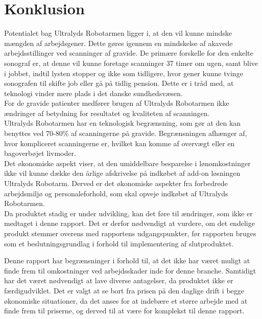 \chapter{Konklusion}
Potentialet bag Ultralyds Robotarmen ligger i, at den vil kunne mindske mængden af arbejdsgener. Dette gøres igennem en mindskelse af akavede arbejdsstillinger ved scanninger af gravide.
De primære forskelle for den enkelte sonograf er, at denne vil kunne foretage scanninger 37 timer om ugen, samt blive i jobbet, indtil lysten stopper og ikke som tidligere, hvor gener kunne tvinge sonografen til skifte job eller gå på tidlig pension. Dette er i tråd med, at teknologi vinder mere plads i det danske sundhedsvæsen.\\
For de gravide patienter medfører brugen af Ultralyds Robotarmen ikke ændringer af betydning for resultatet og kvaliteten af scanningen. \\
Ultralyds Robotarmen har en teknologisk begrænsning, som gør at den kan benyttes ved 70-80\% af scanningerne på gravide. Begrænsningen afhænger af, hvor kompliceret scanningerne er, hvilket kan komme af overvægt eller en bagoverbøjet livmoder. \\
Det økonomiske aspekt viser, at den umiddelbare besparelse i lønomkostninger ikke vil kunne dække den årlige afskrivelse på indkøbet af add-on løsningen Ultralyds Robotarm. Derved er det økonomiske aspekter fra forbedrede arbejdsmiljø og personaleforhold, som skal opveje indkøbet af Ultralyds Robotarmen.\\  
Da produktet stadig er under udvikling, kan det føre til ændringer, som ikke er medtaget i denne rapport. Det er derfor nødvendigt at vurdere, om det endelige produkt stemmer overens med rapportens udgangspunkter, før rapporten bruges som et beslutningsgrundlag i forhold til implementering af slutproduktet.

Denne rapport har begrænsninger i forhold til, at det ikke har været muligt at finde frem til omkostninger ved arbejdsskader inde for denne branche. 
Samtidigt har det været nødvendigt at lave diverse antagelser, da produktet ikke er færdigudviklet. Det er valgt at se bort fra prisen på den daglige drift i begge økonomiske situationer, da det anses for at indebære et større arbejde med at finde frem til priserne, og derved til at være for komplekst til denne rapport.   